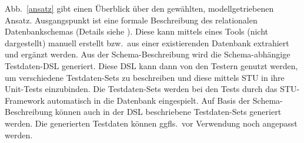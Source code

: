 Abb.~\ref{ansatz} gibt einen Überblick über den gewählten, modellgetriebenen Ansatz.
%
Ausgangspunkt ist eine formale Beschreibung des relationalen Datenbankschemas (Details siehe \cite{MT:Moll:2013}).
%
Diese kann mittels eines Tools (nicht dargestellt) manuell erstellt bzw.~aus einer existierenden Datenbank extrahiert und ergänzt werden.
%
Aus der Schema-Beschreib\-ung wird die Schema-abhängige Testdaten-DSL generiert. 
%
Diese DSL kann dann von den Testern genutzt werden, um verschiedene Testdaten-Sets zu beschreiben und diese mittels STU in ihre Unit-Tests einzubinden.
%
Die Testdaten-Sets werden bei den Tests durch das STU-Framework automatisch in die Datenbank eingespielt.
%
%
Auf Basis der Schema-Be\-schrei\-bung können auch in der DSL beschriebene Test\-da\-ten-Sets  generiert werden. Die generierten Testdaten können ggfls.~vor Verwendung noch angepasst werden.
%
%
%





	




